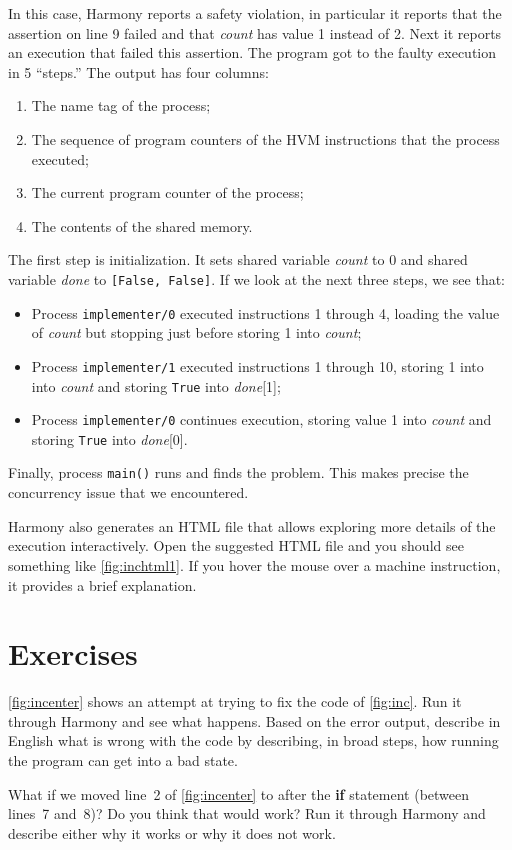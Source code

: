 \documentclass{report}
\begin{document}
In this case, Harmony reports a safety violation, in particular it
reports that the assertion on line 9 failed and that
\textit{count} has value 1 instead of 2.
Next it reports an execution that failed this assertion.
The program got to the faulty execution in 5 ``steps.''
The output has
four columns:
\begin{enumerate}
\item The name tag of the process;
\item The sequence of program counters of the HVM instructions that the process executed;
\item The current program counter of the process;
\item The contents of the shared memory.
\end{enumerate}

The first step is initialization.
It sets shared variable \textit{count} to 0 and
shared variable \textit{done} to \texttt{[False, False]}.
If we look at the next three steps, we see that:
\begin{itemize}
\item Process \texttt{implementer/0}
executed instructions 1 through 4, loading the value of
\textit{count} but stopping just before storing 1 into \textit{count};
\item Process \texttt{implementer/1}
executed instructions 1 through 10, storing 1 into
into \textit{count} and storing \texttt{True} into \textit{done}[1];
\item Process \texttt{implementer/0}
continues execution, storing value 1 into \textit{count}
and storing \texttt{True} into \textit{done}[0].
\end{itemize}
Finally, process \texttt{main()} runs and finds the problem.
This makes precise the concurrency issue that we encountered.

Harmony also generates an HTML file that allows exploring more details
of the execution interactively.
Open the suggested HTML file and you should see something like
\autoref{fig:inchtml1}.
If you hover the mouse over a machine instruction, it provides a
brief explanation.

\section*{Exercises}

\begin{problems}
\item \autoref{fig:incenter} shows an attempt at trying to fix the code of
    \autoref{fig:inc}.  Run it through Harmony and see what happens.  Based on
    the error output, describe in English what is wrong with the code by describing,
    in broad steps, how running the program can get into a bad state.
\item What if we moved line~2 of \autoref{fig:incenter} to after the \textbf{if}
    statement (between lines~7 and~8)?  Do you think that would work?  Run it through
    Harmony and describe either why it works or why it does not work.
\end{problems}
\end{document}
